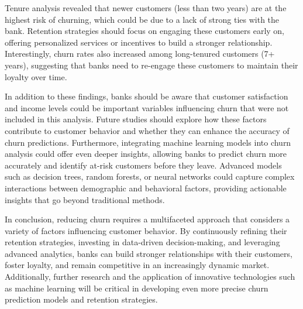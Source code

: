 \documentclass[12pt]{article}
\begin{document}
Tenure analysis revealed that newer customers (less than two years) are at the highest risk of churning, which could be due to a lack of strong ties with the bank. Retention strategies should focus on engaging these customers early on, offering personalized services or incentives to build a stronger relationship. Interestingly, churn rates also increased among long-tenured customers (7+ years), suggesting that banks need to re-engage these customers to maintain their loyalty over time.

In addition to these findings, banks should be aware that customer satisfaction and income levels could be important variables influencing churn that were not included in this analysis. Future studies should explore how these factors contribute to customer behavior and whether they can enhance the accuracy of churn predictions. Furthermore, integrating machine learning models into churn analysis could offer even deeper insights, allowing banks to predict churn more accurately and identify at-risk customers before they leave. Advanced models such as decision trees, random forests, or neural networks could capture complex interactions between demographic and behavioral factors, providing actionable insights that go beyond traditional methods.

In conclusion, reducing churn requires a multifaceted approach that considers a variety of factors influencing customer behavior. By continuously refining their retention strategies, investing in data-driven decision-making, and leveraging advanced analytics, banks can build stronger relationships with their customers, foster loyalty, and remain competitive in an increasingly dynamic market. Additionally, further research and the application of innovative technologies such as machine learning will be critical in developing even more precise churn prediction models and retention strategies.
\newpage
\end{document}
